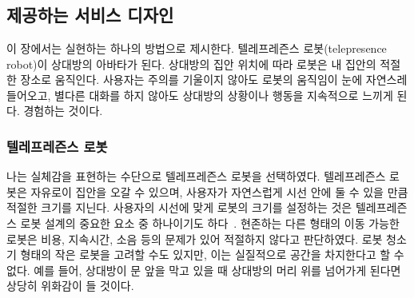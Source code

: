 \chapter{\approach}
\label{sec:system_design}
    
\section{ 제공하는 서비스 디자인}


이 장에서는 \concept\을 실현하는 하나의 방법으로 \approach\를 제시한다. 텔레프레즌스 로봇(telepresence robot)이 상대방의 아바타가 된다. 상대방의 집안 위치에 따라 로봇은 내 집안의 적절한 장소로 움직인다. 사용자는 주의를 기울이지 않아도 로봇의 움직임이 눈에 자연스레 들어오고, 별다른 대화를 하지 않아도 상대방의 상황이나 행동을 지속적으로 느끼게 된다. \concept\을 경험하는 것이다.

\subsection{텔레프레즌스 로봇}


나는 실체감을 표현하는 수단으로 텔레프레즌스 로봇을 선택하였다. 텔레프레즌스 로봇은 자유로이 집안을 오갈 수 있으며, 사용자가 자연스럽게 시선 안에 둘 수 있을 만큼 적절한 크기를 지닌다. 사용자의 시선에 맞게 로봇의 크기를 설정하는 것은 텔레프레즌스 로봇 설계의 중요한 요소 중 하나이기도 하다~\cite{desai2011essential}. 현존하는 다른 형태의 이동 가능한 로봇은 비용, 지속시간, 소음 등의 문제가 있어 적절하지 않다고 판단하였다. 로봇 청소기 형태의 작은 로봇을 고려할 수도 있지만, 이는 실질적으로 공간을 차지한다고 할 수 없다. 예를 들어, 상대방이 문 앞을 막고 있을 때 상대방의 머리 위를 넘어가게 된다면 상당히 위화감이 들 것이다.

